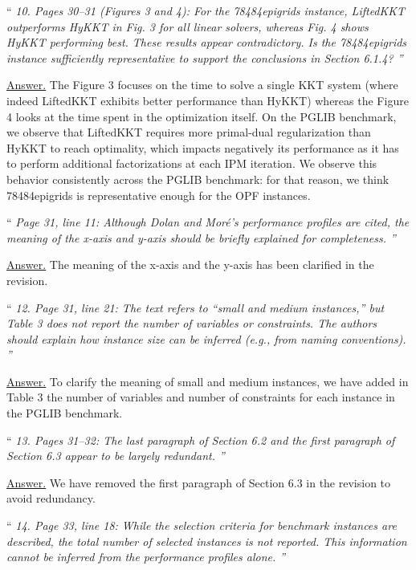 \documentclass[10pt,a4paper]{article}
\newenvironment{quotereviewer}{\vspace{.5cm}{\underline\reviewername} ``\it\footnotesize}{''}
\newcommand{\answer}{\vspace{1mm}\underline{Answer.} }
\begin{document}
\begin{quotereviewer}
10. Pages 30–31 (Figures 3 and 4): For the 78484epigrids instance, LiftedKKT outperforms HyKKT
in Fig. 3 for all linear solvers, whereas Fig. 4 shows HyKKT performing best. These results appear
contradictory. Is the 78484epigrids instance sufficiently representative to support the conclusions in
Section 6.1.4?
\end{quotereviewer}

\answer
The Figure 3 focuses on the time to solve a single KKT system (where
indeed LiftedKKT exhibits better performance than HyKKT) whereas
the Figure 4 looks at the time spent in the optimization itself.
On the PGLIB benchmark, we observe that LiftedKKT requires more primal-dual
regularization than HyKKT to reach optimality, which impacts negatively
its performance as it has to perform additional factorizations at each IPM
iteration. We observe this behavior consistently across the PGLIB benchmark:
for that reason, we think 78484epigrids is representative enough for the OPF instances.


\begin{quotereviewer}
Page 31, line 11: Although Dolan and Moré's performance profiles are cited, the meaning of the
x-axis and y-axis should be briefly explained for completeness.
\end{quotereviewer}

\answer
The meaning of the x-axis and the y-axis has been clarified in the revision.

\begin{quotereviewer}
12. Page 31, line 21: The text refers to “small and medium instances,” but Table 3 does not report the
number of variables or constraints. The authors should explain how instance size can be inferred (e.g.,
from naming conventions).
\end{quotereviewer}

\answer
To clarify the meaning of small and medium instances, we have added in
Table 3 the number of variables and number of constraints for each instance
in the PGLIB benchmark.

\begin{quotereviewer}
13. Pages 31–32: The last paragraph of Section 6.2 and the first paragraph of Section 6.3 appear to be
largely redundant.
\end{quotereviewer}

\answer
We have removed the first paragraph of Section 6.3 in the revision to avoid redundancy.

\begin{quotereviewer}
14. Page 33, line 18: While the selection criteria for benchmark instances are described, the total number
of selected instances is not reported. This information cannot be inferred from the performance profiles
alone.
\end{quotereviewer}
\end{document}
